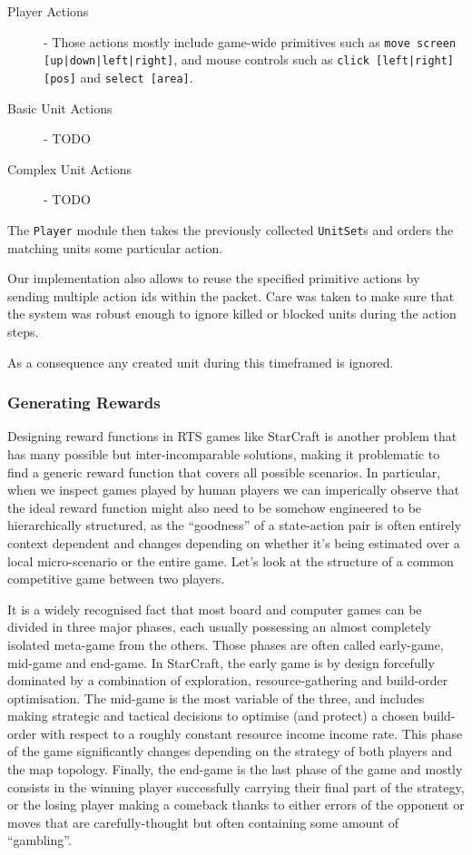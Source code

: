 \begin{description}
\item [Player Actions] - Those actions mostly include game-wide primitives such
  as \texttt{move screen [up|down|left|right]}, and mouse controls such as
  \texttt{click [left|right][pos]} and \texttt{select [area]}.
\item [Basic Unit Actions] - TODO
\item [Complex Unit Actions] - TODO
\end{description}

The \texttt{Player} module then takes the previously collected \texttt{UnitSet}s
and orders the matching units some particular action.

Our implementation also allows to reuse the specified primitive actions by sending
multiple action ids within the packet. 
Care was taken to make sure that the system was robust enough to ignore killed
or blocked units during the action steps.

As a consequence any created unit during this timeframed is ignored.

\subsubsection{Generating Rewards}

Designing reward functions in RTS games like StarCraft is another problem that
has many possible but inter-incomparable solutions, making it problematic to
find a generic reward function that covers all possible scenarios. In
particular, when we inspect games played by human players we can imperically
observe that the ideal reward function might also need to be somehow engineered
to be hierarchically structured, as the ``goodness'' of a state-action pair is
often entirely context dependent and changes depending on whether it's being
estimated over a local micro-scenario or the entire game. Let's look at the
structure of a common competitive game between two players.

It is a widely recognised fact that most board and computer games can be divided
in three major phases, each usually possessing an almost completely isolated
meta-game from the others. Those phases are often called early-game, mid-game
and end-game. In StarCraft, the early game is by design forcefully dominated by
a combination of exploration, resource-gathering and build-order optimisation.
The mid-game is the most variable of the three, and includes making strategic
and tactical decisions to optimise (and protect) a chosen build-order with
respect to a roughly constant resource income income rate. This phase of the
game significantly changes depending on the strategy of both players and the map
topology. Finally, the end-game is the last phase of the game and mostly
consists in the winning player successfully carrying their final part of the
strategy, or the losing player making a comeback thanks to either errors of the
opponent or moves that are carefully-thought but often containing some amount of
``gambling''.

